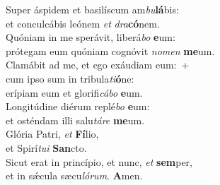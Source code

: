 \oddverse Super áspidem et basilíscum am\textit{bu}\textbf{lá}bis:~\*\\
\oddverse et conculcábis leónem \textit{et} \textit{dra}\textbf{có}nem.\\
\evenverse Quóniam in me sperávit, liberá\textit{bo} \textbf{e}um:~\*\\
\evenverse prótegam eum quóniam cognóvit \textit{no}\textit{men} \textbf{me}um.\\
\oddverse Clamábit ad me, et ego exáudiam eum:~+\\
\oddverse  cum ipso sum in tribula\textit{ti}\textbf{ó}ne:~\*\\
\oddverse erípiam eum et glorifi\textit{cá}\textit{bo} \textbf{e}um.\\
\evenverse Longitúdine diérum replé\textit{bo} \textbf{e}um:~\*\\
\evenverse et osténdam illi salu\textit{tá}\textit{re} \textbf{me}um.\\
\oddverse Glória Patri, \textit{et} \textbf{Fí}lio,~\*\\
\oddverse et Spirí\textit{tu}\textit{i} \textbf{San}cto.\\
\evenverse Sicut erat in princípio, et nunc, \textit{et} \textbf{sem}per,~\*\\
\evenverse et in sǽcula sæcu\textit{ló}\textit{rum}. \textbf{A}men.\\
